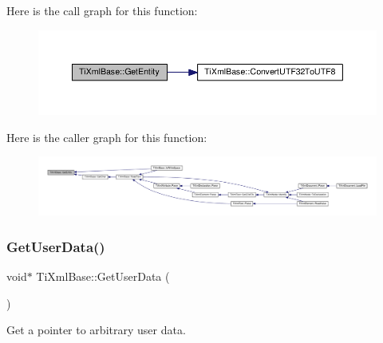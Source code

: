 Here is the call graph for this function\+:\nopagebreak
\begin{figure}[H]
\begin{center}
\leavevmode
\includegraphics[width=350pt]{class_ti_xml_base_ac5c08bf3deffcda0bf8ce2958372b584_cgraph}
\end{center}
\end{figure}
Here is the caller graph for this function\+:\nopagebreak
\begin{figure}[H]
\begin{center}
\leavevmode
\includegraphics[width=350pt]{class_ti_xml_base_ac5c08bf3deffcda0bf8ce2958372b584_icgraph}
\end{center}
\end{figure}
\mbox{\label{class_ti_xml_base_a6559a530ca6763fc301a14d77ed28c17}} 
\subsubsection{\texorpdfstring{Get\+User\+Data()}{GetUserData()}\hspace{0.1cm}{\footnotesize\ttfamily [1/2]}}
{\footnotesize\ttfamily void$\ast$ Ti\+Xml\+Base\+::\+Get\+User\+Data (\begin{DoxyParamCaption}{ }\end{DoxyParamCaption})\hspace{0.3cm}{\ttfamily [inline]}}



Get a pointer to arbitrary user data. 

\mbox{\label{class_ti_xml_base_aaaaefcef8c0e6e32f8920f4982b2daf3}} 
